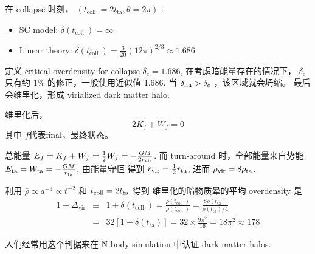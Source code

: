 \documentclass[12pt]{ctexart}
\newcommand{\new}[1]{\textcolor{blue}{#1}}
\begin{document}
在 collapse 时刻，
$\left(t_{\text {coll }}=2 t_{\mathrm{ta}}  , \theta=2\pi\right)$ :
\begin{itemize}
    \item SC model: $\delta\left(t_{\text {coll }}\right)=\infty$
    \item Linear theory: $\delta\left(t_{\text {coll }}\right)=\frac{3}{20}(12 \pi)^{2 / 3} \approx 1.686$
\end{itemize}



定义 critical overdensity for collapse $\delta_c = 1.686$, 在考虑暗能量存在的情况下， $\delta_c$ 只有约 1\% 的修正，一般使用近似值 1.686.
当 $\delta_{\rm{lin}} > \delta_c$ ，该区域就会坍缩。
最后会维里化，形成 virialized dark matter halo.



维里化后， 
\begin{equation}
    2K_f + W_f = 0
\end{equation}
其中 $f$代表final，最终状态。

总能量 $E_f = K_f + W_f = \frac{1}{2} W_f = -\frac{GM}{2 r _{\rm{vir}} }$.
而 turn-around 时，全部能量来自势能 $E _{\rm{ta}} = W _{\rm{ta}} =-\frac{GM}{r _{\rm{ta}} }$,
由能量守恒 得到 $r _{\rm{vir}} =\frac{1}{2} r _{\rm{ta}} $,
进而
$\rho _{\rm{vir}} = 8 \rho _{\rm{ta}} $. 

利用 $\bar{\rho} \propto a^{-3} \propto t^{-2}$ 和
$t _{\rm{coll}} = 2 t _{\rm{ta}} $
得到
维里化的暗物质晕的平均 overdensity 是
\begin{eqnarray}
        1+\Delta_{\mathrm{vir}} &\equiv& 1+\delta\left(t_{\text {coll }}\right)=\frac{\rho\left(t_{\text {coll }}\right)}{\bar{\rho}\left(t_{\text {coll }}\right)}=  \frac{8 \rho\left(t_{\mathrm{ta}}\right)}{\bar{\rho}\left(t_{\mathrm{ta}}\right) / 4} \\ 
        &=& 32\left[1+\delta\left(t_{\mathrm{ta}}\right)\right]=32 \times \frac{9 \pi^{2}}{16} = 18\pi^2 \approx 178
\end{eqnarray}

人们经常用这个判据来在 N-body simulation 中认证 dark matter halos.
\end{document}

